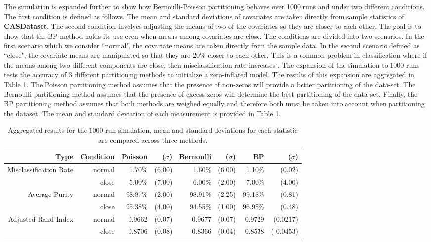 \documentclass[12pt,letterpaper]{article}
\numberwithin{equation}{section}
\numberwithin{equation}{section}
\numberwithin{equation}{section}
\begin{document}
The simulation is expanded further to show how Bernoulli-Poisson partitioning behaves over 1000 runs and under two different conditions. The first condition is defined as follows. The mean and standard deviations of covariates are taken directly from sample statistics of \textbf{CASDataset}. The second condition involves adjusting the means of two of the covariates so they are closer to each other. The goal is to show that the BP-method holds its use even when means among covariates are close. The conditions are divided into two scenarios. In the first scenario which we consider ``normal", the covariate means are taken directly from the sample data. In the second scenario defined as ``close", the covariate means are manipulated so that they are $20 \%$ closer to each other. This is a common problem in classification where if the means among two different components are close, then misclassification rate increases \citep{LimHwa}. The expansion of the simulation to $1000$ runs tests the accuracy of 3 different partitioning methods to initialize a zero-inflated model. The results of this expansion are aggregated in Table \ref{table:exper2}.  The Poisson partitioning method assumes that the presence of non-zeros will provide a better partitioning of the data-set. The Bernoulli partitioning method assumes that the presence of excess zeros will determine the best partitioning of the data-set. Finally, the BP partitioning method assumes that both methods are weighed equally and therefore both must be taken into account when partitioning the dataset. The mean and standard deviation of each measurement is provided in Table \ref{table:exper2}.

\begin{table}[!htb]
\begin{center}
\caption{Aggregated results for the $1000$ run simulation, mean and standard deviations for each statistic are compared across three methods.}
\label{table:exper2}
\begin{tabular}{rrrrrrrr}
\hline\hline
Type   & Condition & Poisson & ($\sigma $) & Bernoulli & ($ \sigma $) & BP & ($ \sigma $) \\
\hline
Misclassification Rate& normal        & 1.70\% & (6.00)       & 1.60\%  & (6.00)         & 1.10\% & (0.02)         \\
       & close      & 5.00\% & (7.00)       & 6.00\% & (2.00)         & 7.00\% & (4.00)         \\
Average Purity & normal     & 98.87\% & (2.00)    & 98.91\% & (2.25)      & 99.18\% & (0.81)     \\
       & close       & 95.38\% & (4.00)    & 94.55\% & (1.00)      & 96.95\% & (0.48)      \\
Adjusted Rand Index  & normal      & 0.9662 & (0.07)    & 0.9677  & (0.07)     & 0.9729 & (0.0217)      \\
       & close         & 0.8706 & (0.08)    & 0.8366 & (0.04)      & 0.8538 & ( 0.0453) \\
       \hline\hline
\end{tabular}
\end{center}
\end{table}
\end{document}
